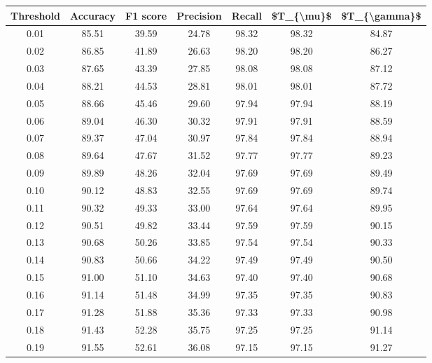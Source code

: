 \begin{tabular}{|c|c|c|c|c|c|c|}
\hline
 Threshold &  Accuracy &  F1 score &  Precision &  Recall &  \$T\_\{\textbackslash mu\}\$ &  \$T\_\{\textbackslash gamma\}\$ \\
\hline
      0.01 &     85.51 &     39.59 &      24.78 &   98.32 &      98.32 &         84.87 \\
      0.02 &     86.85 &     41.89 &      26.63 &   98.20 &      98.20 &         86.27 \\
      0.03 &     87.65 &     43.39 &      27.85 &   98.08 &      98.08 &         87.12 \\
      0.04 &     88.21 &     44.53 &      28.81 &   98.01 &      98.01 &         87.72 \\
      0.05 &     88.66 &     45.46 &      29.60 &   97.94 &      97.94 &         88.19 \\
      0.06 &     89.04 &     46.30 &      30.32 &   97.91 &      97.91 &         88.59 \\
      0.07 &     89.37 &     47.04 &      30.97 &   97.84 &      97.84 &         88.94 \\
      0.08 &     89.64 &     47.67 &      31.52 &   97.77 &      97.77 &         89.23 \\
      0.09 &     89.89 &     48.26 &      32.04 &   97.69 &      97.69 &         89.49 \\
      0.10 &     90.12 &     48.83 &      32.55 &   97.69 &      97.69 &         89.74 \\
      0.11 &     90.32 &     49.33 &      33.00 &   97.64 &      97.64 &         89.95 \\
      0.12 &     90.51 &     49.82 &      33.44 &   97.59 &      97.59 &         90.15 \\
      0.13 &     90.68 &     50.26 &      33.85 &   97.54 &      97.54 &         90.33 \\
      0.14 &     90.83 &     50.66 &      34.22 &   97.49 &      97.49 &         90.50 \\
      0.15 &     91.00 &     51.10 &      34.63 &   97.40 &      97.40 &         90.68 \\
      0.16 &     91.14 &     51.48 &      34.99 &   97.35 &      97.35 &         90.83 \\
      0.17 &     91.28 &     51.88 &      35.36 &   97.33 &      97.33 &         90.98 \\
      0.18 &     91.43 &     52.28 &      35.75 &   97.25 &      97.25 &         91.14 \\
      0.19 &     91.55 &     52.61 &      36.08 &   97.15 &      97.15 &         91.27 \\

\end{tabular}

